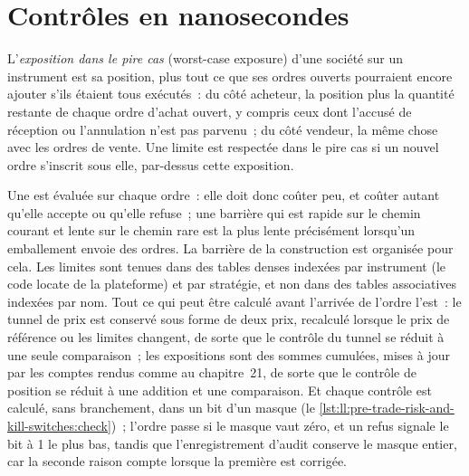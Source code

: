 \section{Contrôles en nanosecondes}

\begin{definition}\label{def:ll:pre-trade-risk-and-kill-switches:worst}
L'\emph{exposition dans le pire cas} (worst-case exposure) d'une société sur un instrument est sa position, plus tout ce que ses
ordres ouverts pourraient encore ajouter s'ils étaient tous exécutés~: du côté acheteur, la position plus la quantité restante de chaque ordre d'achat ouvert,
y compris ceux dont l'accusé de réception ou l'annulation n'est pas parvenu~; du côté vendeur, la même chose avec les ordres de vente. Une limite est
respectée dans le pire cas si un nouvel ordre s'inscrit sous elle, par-dessus cette exposition.
\end{definition}

Une  est évaluée sur chaque ordre~: elle doit donc coûter peu, et coûter autant qu'elle accepte ou qu'elle refuse~; une barrière qui est
rapide sur le chemin courant et lente sur le chemin rare est la plus lente précisément lorsqu'un emballement envoie des ordres. La barrière de la construction est
organisée pour cela. Les limites sont tenues dans des tables denses indexées par instrument (le code locate de la plateforme) et par stratégie, et non dans des
tables associatives indexées par nom. Tout ce qui peut être calculé avant l'arrivée de l'ordre l'est~: le tunnel de prix est conservé sous forme de deux prix, recalculé lorsque le
prix de référence ou les limites changent, de sorte que le contrôle du tunnel se réduit à une seule comparaison~; les expositions sont des sommes cumulées, mises à jour par
les comptes rendus comme au chapitre~21, de sorte que le contrôle de position se réduit à une addition et une comparaison. Et chaque contrôle est calculé, sans
branchement, dans un bit d'un masque (le \cref{lst:ll:pre-trade-risk-and-kill-switches:check})~; l'ordre passe si le masque vaut zéro,
et un refus signale le bit à 1 le plus bas, tandis que l'enregistrement d'audit conserve le masque entier, car la seconde raison compte lorsque
la première est corrigée.

\label{lst:ll:pre-trade-risk-and-kill-switches:check}

